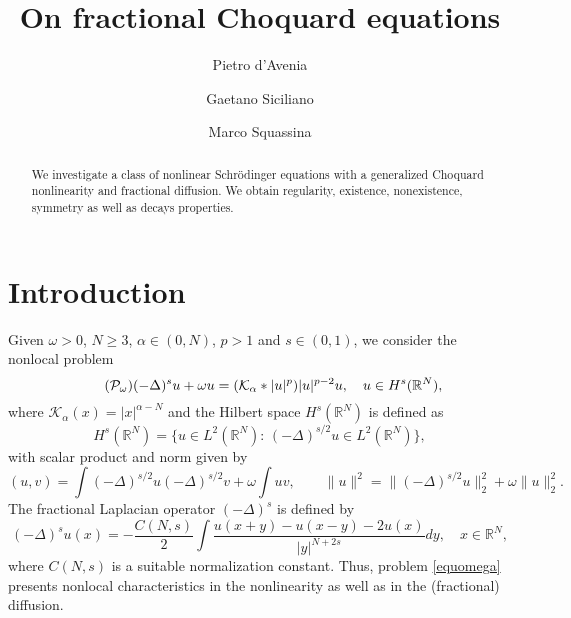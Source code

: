\documentclass[10pt]{amsart}
\title[Fractional Choquard equations]{On fractional Choquard equations}
\author[P. d'Avenia]{Pietro d'Avenia}
\author[G. Siciliano]{Gaetano Siciliano}
\author[M. Squassina]{Marco Squassina}
\numberwithin{equation}{section}
\begin{document}
\begin{abstract}
We investigate a class of nonlinear Schr\"odinger equations with
a generalized Choquard nonlinearity and fractional diffusion. We obtain regularity, existence,
nonexistence, symmetry as well as decays properties.
\end{abstract}
\maketitle

\section{Introduction}

\noindent
Given $\omega>0$, $N\geq 3$,
$\alpha\in (0,N)$, $p>1$ and $s\in (0,1)$, we consider the nonlocal problem
 \begin{equation} \label{equomega} \tag{$\mathcal{P}_\omega$}
 {{(-\Delta)^{s}}} u+\omega u={{(\mathcal K_{\alpha}*|u|^{p})}} |u|^{p-2}u,
 \quad u\in H^{s}(\mathbb R^{N}), 
 \end{equation}
where $\mathcal K_{\alpha}(x)=|x|^{\alpha-N}$ 
and  the Hilbert space $H^s({{\mathbb R}}^N)$ is defined as
\[
H^s({{\mathbb R}}^N)=\big\{u\in L^2({{\mathbb R}}^N):\,
(-\Delta)^{s/2}u \in L^2({{\mathbb R}}^N)\big\},
\]
with scalar product and norm given by
\[
(u,v)= \int (-\Delta)^{s/2}u (-\Delta)^{s/2}v + \omega \int uv,
\qquad
\|u\|^2=\|(-\Delta)^{s/2}u \|_2^2+\omega \|u\|_2^2.
\]
The fractional Laplacian operator $(-\Delta)^s$ is defined by
\[
(-\Delta)^su(x)=-\frac{C(N,s)}{2}\int \frac{u(x+y)-u(x-y)-2u(x)}{|y|^{N+2s}}dy, \quad x\in{{\mathbb R}}^N,
\]
where $C(N,s)$ is a suitable normalization constant. Thus, problem \eqref{equomega}
presents nonlocal characteristics in the nonlinearity as well as in the (fractional) diffusion.
\end{document}
